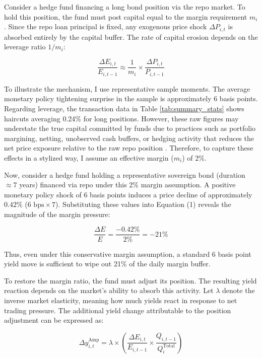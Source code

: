 \documentclass[english, 11pt, oneside]{article}
\begin{document}
Consider a hedge fund financing a long bond position via the repo market. To hold this position, the fund must post capital equal to the margin requirement $m_i$. Since the repo loan principal is fixed, any exogenous price shock $\Delta P_{i,t}$ is absorbed entirely by the capital buffer. The rate of capital erosion depends on the leverage ratio $1/m_i$:

\begin{equation}
\frac{\Delta E_{i,t}}{E_{i,t-1}} \approx \frac{1}{m_i} \times \frac{\Delta P_{i,t}}{P_{i,t-1}}
\end{equation}

To illustrate the mechanism, I use representative sample moments. The average monetary policy tightening surprise in the sample is approximately 6 basis points. Regarding leverage, the transaction data in Table \ref{tab:summary_stats} shows haircuts averaging 0.24\% for long positions. However, these raw figures may understate the true capital committed by funds due to practices such as portfolio margining, netting, unobserved cash buffers, or hedging activity that reduces the net price exposure relative to the raw repo position \citep{hempel2023, hill2025, hermes2025a}. Therefore, to capture these effects in a stylized way, I assume an effective margin ($m_i$) of 2\%.

Now, consider a hedge fund holding a representative sovereign bond (duration $\approx 7$ years) financed via repo under this 2\% margin assumption. A positive monetary policy shock of 6 basis points induces a price decline of approximately $0.42\%$ ($6\text{ bps} \times 7$). Substituting these values into Equation (1) reveals the magnitude of the margin pressure:

\begin{equation*}
\frac{\Delta E}{E} = \frac{-0.42\%}{2\%} = -21\%
\end{equation*}

Thus, even under this conservative margin assumption, a standard 6 basis point yield move is sufficient to wipe out 21\% of the daily margin buffer.

To restore the margin ratio, the fund must adjust its position. The resulting yield reaction depends on the market's ability to absorb this activity. Let $\lambda$ denote the inverse market elasticity, meaning how much yields react in response to net trading pressure. The additional yield change attributable to the position adjustment can be expressed as:

\begin{equation}
\Delta y_{i,t}^{\text{Amp}} = \lambda \times \left( \frac{\Delta E_{i,t}}{E_{i,t-1}} \times \frac{Q_{i,t-1}}{Q^{\text{Total}}_{i}} \right)
\end{equation}
\end{document}
